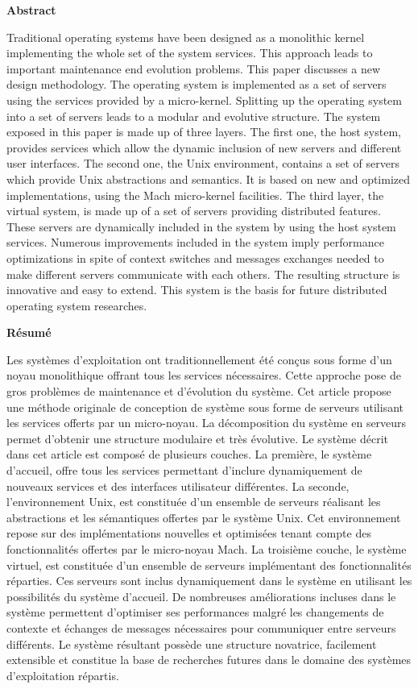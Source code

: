 {\bf Abstract}

	Traditional operating systems have been designed as a monolithic
kernel implementing the whole set of the system services. This approach leads
to important maintenance end evolution problems. This paper discusses a new
design methodology. The operating system is implemented as a set of servers
using the services provided by a micro-kernel. Splitting up the operating
system into a set of servers leads to a modular and evolutive structure. The
system exposed in this paper is made up of three layers. The first one, the
host system, provides services which allow the dynamic inclusion of new servers
and different user interfaces. The second one, the Unix environment, contains
a set of servers which provide Unix abstractions and semantics. It is based
on new and optimized implementations, using the Mach micro-kernel facilities.
The third layer, the virtual system, is made up of a set of servers providing
distributed features. These servers are dynamically included in the system by
using the host system services. Numerous improvements included in the system
imply performance optimizations in spite of context switches and messages
exchanges needed to make different servers communicate with each others. The
resulting structure is innovative and easy to extend. This system is the basis
for future distributed operating system researches.

{\bf R\'esum\'e}

        Les syst\`emes d'exploitation ont traditionnellement \'et\'e con\c{c}us
sous forme d'un noyau monolithique offrant tous les services n\'ecessaires.
Cette approche pose de gros probl\`emes de maintenance et d'\'evolution du
syst\`eme. Cet article propose une m\'ethode originale de conception de
syst\`eme sous forme de serveurs utilisant les services offerts par un
micro-noyau. La d\'ecomposition du syst\`eme en serveurs permet d'obtenir une
structure modulaire et tr\`es \'evolutive. Le syst\`eme d\'ecrit dans cet
article est compos\'e de plusieurs couches. La premi\`ere, le syst\`eme
d'accueil, offre tous les services permettant d'inclure dynamiquement de
nouveaux services et des interfaces utilisateur diff\'erentes. La seconde,
l'environnement Unix, est constitu\'ee d'un ensemble de serveurs r\'ealisant
les abstractions et les s\'emantiques offertes par le syst\`eme Unix.
Cet environnement repose sur des impl\'ementations nouvelles et optimis\'ees
tenant compte des fonctionnalit\'es offertes par le micro-noyau Mach. La
troisi\`eme couche, le syst\`eme virtuel, est constitu\'ee d'un ensemble de
serveurs impl\'ementant des fonctionnalit\'es r\'eparties. Ces serveurs sont
inclus dynamiquement dans le syst\`eme en utilisant les possibilit\'es du
syst\`eme d'accueil. De nombreuses am\'eliorations incluses dans le syst\`eme
permettent d'optimiser ses performances malgr\'e les changements de contexte
et \'echanges de messages n\'ecessaires pour communiquer entre serveurs
diff\'erents. Le syst\`eme r\'esultant poss\`ede une structure novatrice,
facilement extensible et constitue la base de recherches futures dans le
domaine des syst\`emes d'exploitation r\'epartis.

